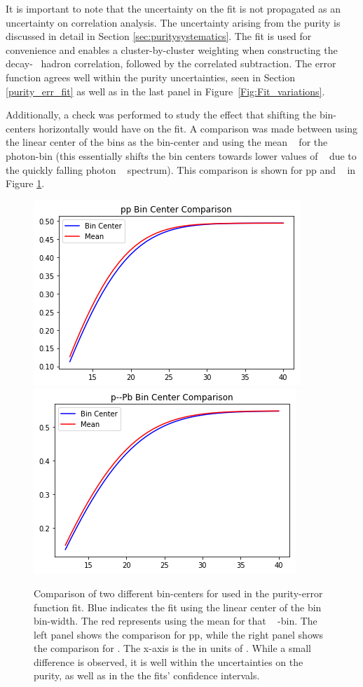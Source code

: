 It is important to note that the uncertainty on the fit is not propagated as an uncertainty on correlation analysis. The uncertainty arising from the purity is discussed in detail in Section \ref{sec:puritysystematics}. The fit is used for convenience and enables a cluster-by-cluster weighting when constructing the decay-\gammaiso~ hadron correlation, followed by the correlated subtraction. The error function agrees well within the purity uncertainties, seen in Section \ref{purity_err_fit} as well as in the last panel in Figure~\ref{Fig:Fit_variations}.

Additionally, a check was performed to study the effect that shifting the bin-centers horizontally would have on the fit. A comparison was made between using the linear center of the bins as the bin-center and using the mean \pt~ for the photon-bin (this essentially shifts the bin centers towards lower values of \pt~ due to the quickly falling photon \pt~ spectrum). This comparison is shown for pp and \pPb~ in Figure \ref{Fig:Error_Fit_Mean_Center}.

\begin{figure}
    \centering
    \includegraphics[width=.49\textwidth]{Checks_Systematics/pp_MeanVsBinCenter.png}
    \includegraphics[width=.49\textwidth]{Checks_Systematics/pPb_Compare.png}
    \caption{Comparison of two different bin-centers for used in the purity-error function fit. Blue indicates the fit using the linear center of the bin \pt bin-width. The red represents using the mean \pt for that \gammaiso~ \pt-bin. The left panel shows the comparison for pp, while the right panel shows the comparison for \pPb. The x-axis is the \gammaiso \pt in units of \GeVc. While a small difference is observed, it is well within the uncertainties on the purity, as well as in the the fits' confidence intervals.}
    \label{Fig:Error_Fit_Mean_Center}
\end{figure}


